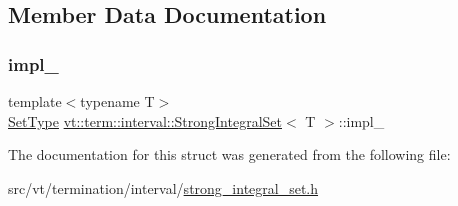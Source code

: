 \subsection{Member Data Documentation}
\mbox{\label{structvt_1_1term_1_1interval_1_1_strong_integral_set_a39785ca73a01b9e8f34c90af37380dd3}} 
\subsubsection{\texorpdfstring{impl\+\_\+}{impl\_}}
{\footnotesize\ttfamily template$<$typename T$>$ \\
\hyperlink{structvt_1_1term_1_1interval_1_1_strong_integral_set_a8ddaa89df13b55d7a13b6275c162f51e}{Set\+Type} \hyperlink{structvt_1_1term_1_1interval_1_1_strong_integral_set}{vt\+::term\+::interval\+::\+Strong\+Integral\+Set}$<$ T $>$\+::impl\+\_\+\hspace{0.3cm}{\ttfamily [private]}}



The documentation for this struct was generated from the following file\+:\begin{DoxyCompactItemize}
\item 
src/vt/termination/interval/\hyperlink{strong__integral__set_8h}{strong\+\_\+integral\+\_\+set.\+h}\end{DoxyCompactItemize}
